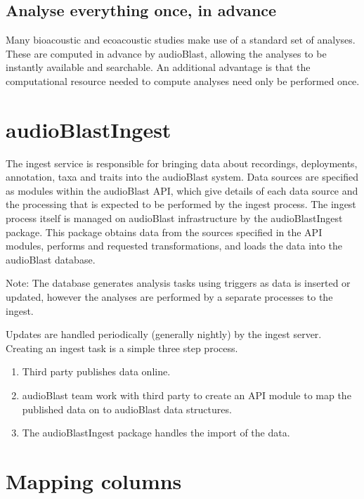 \documentclass[
]{book}
\begin{document}
\hypertarget{analyse-everything-once-in-advance}{%
\section{Analyse everything once, in advance}\label{analyse-everything-once-in-advance}}

Many bioacoustic and ecoacoustic studies make use of a standard set of analyses. These are computed in advance by audioBlast, allowing the analyses to be instantly available and searchable. An additional advantage is that the computational resource needed to compute analyses need only be performed once.

\hypertarget{audioblastingest}{%
\chapter{audioBlastIngest}\label{audioblastingest}}

The ingest service is responsible for bringing data about recordings, deployments, annotation, taxa and traits into the audioBlast system. Data sources are specified as modules within the audioBlast API, which give details of each data source and the processing that is expected to be performed by the ingest process. The ingest process itself is managed on audioBlast infrastructure by the audioBlastIngest package. This package obtains data from the sources specified in the API modules, performs and requested transformations, and loads the data into the audioBlast database.

Note: The database generates analysis tasks using triggers as data is inserted or updated, however the analyses are performed by a separate processes to the ingest.

Updates are handled periodically (generally nightly) by the ingest server. Creating an ingest task is a simple three step process.

\begin{enumerate}
\def\labelenumi{\arabic{enumi}.}
\item
  Third party publishes data online.
\item
  audioBlast team work with third party to create an API module to map the published data on to audioBlast data structures.
\item
  The audioBlastIngest package handles the import of the data.
\end{enumerate}

\hypertarget{mapping-columns}{%
\chapter{Mapping columns}\label{mapping-columns}}
\end{document}
